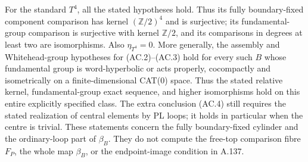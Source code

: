 For the standard $T^4$, all the stated hypotheses hold. Thus its
fully boundary-fixed component comparison has kernel
$(\mathbb Z/2)^4$ and is surjective; its fundamental-group comparison
is surjective with kernel $\mathbb Z/2$, and its comparisons in degrees
at least two are isomorphisms. Also $\eta_{T^4}=0$.
More generally, the assembly and Whitehead-group hypotheses for
(AC.2)--(AC.3) hold for every such $B$ whose fundamental group is
word-hyperbolic or acts properly, cocompactly and isometrically on a
finite-dimensional CAT(0) space. Thus the stated relative kernel,
fundamental-group exact sequence, and higher isomorphisms hold on this
entire explicitly specified class. The extra conclusion (AC.4) still
requires the stated realization of central elements by PL loops; it
holds in particular when the centre is trivial.
These statements concern the fully boundary-fixed cylinder and the
ordinary-loop part of $\beta_B$. They do not compute the free-top
comparison fibre $F_P$, the whole map $\beta_B$, or the endpoint-image
condition in A.137.

